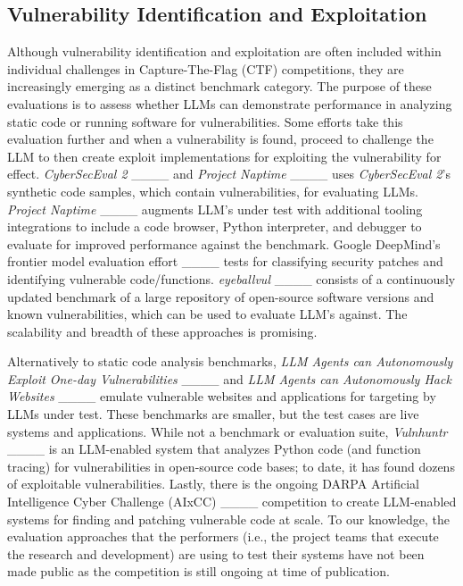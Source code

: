 \subsection{Vulnerability Identification and Exploitation}

Although vulnerability identification and exploitation are often included within individual challenges in Capture-The-Flag (CTF) competitions, they are increasingly emerging as a distinct benchmark category. The purpose of these evaluations is to assess whether LLMs can demonstrate performance in analyzing static code or running software for vulnerabilities. Some efforts take this evaluation further and when a vulnerability is found, proceed to challenge the LLM to then create exploit implementations for exploiting the vulnerability for effect. \textit{CyberSecEval 2} ____ and \textit{Project Naptime} ____ uses \textit{CyberSecEval 2}'s synthetic code samples, which contain vulnerabilities, for evaluating LLMs. \textit{Project Naptime} ____ augments LLM's under test with additional tooling integrations to include a code browser, Python interpreter, and debugger to evaluate for improved performance against the benchmark. Google DeepMind's frontier model evaluation effort ____ tests for classifying security patches and identifying vulnerable code/functions. \textit{eyeballvul} ____ consists of a continuously updated benchmark of a large repository of open-source software versions and known vulnerabilities, which can be used to evaluate LLM’s against. The scalability and breadth of these approaches is promising.

Alternatively to static code analysis benchmarks, \textit{LLM Agents can Autonomously Exploit One-day Vulnerabilities} ____ and \textit{LLM Agents can Autonomously Hack Websites} ____  emulate vulnerable websites and applications for targeting by LLMs under test. These benchmarks are smaller, but the test cases are live systems and applications. While not a benchmark or evaluation suite, \textit{Vulnhuntr} ____ is an LLM-enabled system that analyzes Python code (and function tracing) for vulnerabilities in open-source code bases; to date, it has found dozens of exploitable vulnerabilities. Lastly, there is the ongoing DARPA Artificial Intelligence Cyber Challenge (AIxCC) ____ competition to create LLM-enabled systems for finding and patching vulnerable code at scale. To our knowledge, the evaluation approaches that the performers (i.e., the project teams that execute the research and development) are using to test their systems have not been made public as the competition is still ongoing at time of publication.


